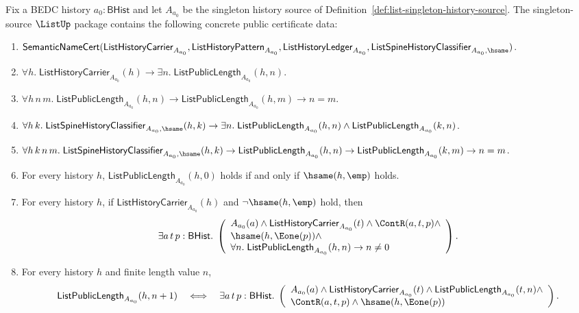 \begin{theorem}
\label{thm:list-singleton-source-finite-data-certificate-package}
Fix a BEDC history $a_0:\mathsf{BHist}$ and let $A_{a_0}$ be the singleton
history source of Definition~\ref{def:list-singleton-history-source}. The
singleton-source $\ListUp$ package contains the following concrete public
certificate data:
\begin{enumerate}
  \item
  $\mathsf{SemanticNameCert}(\mathsf{ListHistoryCarrier}_{A_{a_0}},
  \mathsf{ListHistoryPattern}_{A_{a_0}},
  \mathsf{ListHistoryLedger}_{A_{a_0}},
  \mathsf{ListSpineHistoryClassifier}_{A_{a_0},\hsame})$.
  \item
  $\forall h.\;\mathsf{ListHistoryCarrier}_{A_{a_0}}(h)\to
  \exists n.\;\mathsf{ListPublicLength}_{A_{a_0}}(h,n)$.
  \item
  $\forall h\,n\,m.\;\mathsf{ListPublicLength}_{A_{a_0}}(h,n)\to
  \mathsf{ListPublicLength}_{A_{a_0}}(h,m)\to n=m$.
  \item
  $\forall h\,k.\;
  \mathsf{ListSpineHistoryClassifier}_{A_{a_0},\hsame}(h,k)\to
  \exists n.\;\mathsf{ListPublicLength}_{A_{a_0}}(h,n)\land
  \mathsf{ListPublicLength}_{A_{a_0}}(k,n)$.
  \item
  $\forall h\,k\,n\,m.\;
  \mathsf{ListSpineHistoryClassifier}_{A_{a_0},\hsame}(h,k)\to
  \mathsf{ListPublicLength}_{A_{a_0}}(h,n)\to
  \mathsf{ListPublicLength}_{A_{a_0}}(k,m)\to n=m$.
  \item
  For every history $h$, $\mathsf{ListPublicLength}_{A_{a_0}}(h,0)$ holds if
  and only if $\hsame(h,\emp)$ holds.
  \item
  For every history $h$, if $\mathsf{ListHistoryCarrier}_{A_{a_0}}(h)$ and
  $\neg\hsame(h,\emp)$ hold, then
  $$
  \exists a\,t\,p:\mathsf{BHist}.\;
  \left(
  \begin{array}{l}
  A_{a_0}(a)\land \mathsf{ListHistoryCarrier}_{A_{a_0}}(t)\land
  \ContR(a,t,p)\land\\
  \hsame(h,\Eone(p))\land\\
  \forall n.\;\mathsf{ListPublicLength}_{A_{a_0}}(h,n)\to n\neq 0
  \end{array}
  \right).
  $$
  \item
  For every history $h$ and finite length value $n$,
  $$
  \mathsf{ListPublicLength}_{A_{a_0}}(h,n+1)
  \quad\Longleftrightarrow\quad
  \exists a\,t\,p:\mathsf{BHist}.\;
  \left(
  \begin{array}{l}
  A_{a_0}(a)\land \mathsf{ListHistoryCarrier}_{A_{a_0}}(t)\land
  \mathsf{ListPublicLength}_{A_{a_0}}(t,n)\land\\
  \ContR(a,t,p)\land \hsame(h,\Eone(p))
  \end{array}
  \right).
  $$
\end{enumerate}
\end{theorem}
